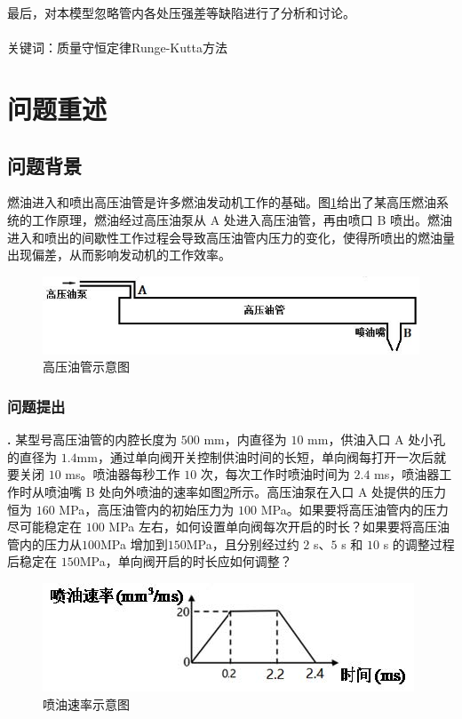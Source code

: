 \documentclass[12pt,a4paper]{article}
\begin{document}
最后，对本模型忽略管内各处压强差等缺陷进行了分析和讨论。\\
~\\
关键词：质量守恒定律\quad Runge-Kutta方法
\newpage

\section{问题重述}

\subsection{问题背景}
燃油进入和喷出高压油管是许多燃油发动机工作的基础。图\ref{gaoyayouguanshiyitu}给出了某高压燃油系统的工作原理，燃油经过高压油泵从 A 处进入高压油管，再由喷口 B 喷出。燃油进入和喷出的间歇性工作过程会导致高压油管内压力的变化，使得所喷出的燃油量出现偏差，从而影响发动机的工作效率。
\begin{figure}[h]
\centering
\includegraphics[scale=1]{gaoyayouguanshiyitu.jpg}
\caption{高压油管示意图}\label{gaoyayouguanshiyitu}
\end{figure}

\subsubsection{问题提出}
\textbf{.} 某型号高压油管的内腔长度为 $500$ mm，内直径为 $10$ mm，供油入口 A 处小孔的直径为 $1.4$mm，通过单向阀开关控制供油时间的长短，单向阀每打开一次后就要关闭 $10$ ms。喷油器每秒工作 $10$ 次，每次工作时喷油时间为 $2.4$ ms，喷油器工作时从喷油嘴 B 处向外喷油的速率如图\ref{penyousulvshiyitu}所示。高压油泵在入口 A 处提供的压力恒为 $160$ MPa，高压油管内的初始压力为 $100$ MPa。如果要将高压油管内的压力尽可能稳定在 $100$ MPa 左右，如何设置单向阀每次开启的时长？如果要将高压油管内的压力从$100$MPa 增加到$150$MPa，且分别经过约 $2$ s、$5$ s 和 $10$ s 的调整过程后稳定在 $150$MPa，单向阀开启的时长应如何调整？
\begin{figure}[h]
\centering
\includegraphics[scale=1]{penyousulvshiyitu.jpg}
\caption{喷油速率示意图}\label{penyousulvshiyitu}
\end{figure}
\end{document}
